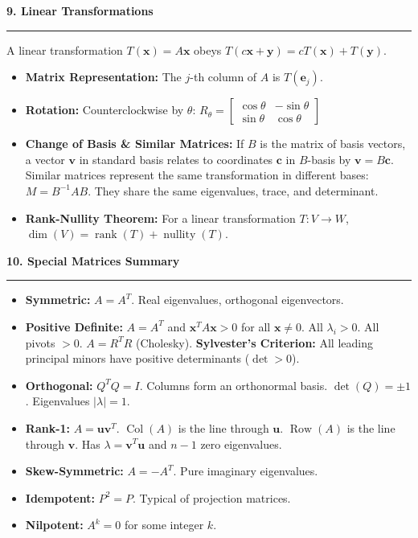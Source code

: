 \documentclass[10pt, landscape, twocolumn]{article}
\newcommand{\cheatsheetsection}[1]{
    \vspace{0.6em}
    {\color{themeblue}\large\bfseries #1} \par
    \vspace{-0.5em}
    {\color{themeblue}\rule{\linewidth}{1pt}} \par
    \vspace{0.2em}
}
\begin{document}
\cheatsheetsection{9. Linear Transformations}
A linear transformation $T(\mathbf{x}) = A\mathbf{x}$ obeys $T(c\mathbf{x} + \mathbf{y}) = cT(\mathbf{x}) + T(\mathbf{y})$.
\begin{itemize}[leftmargin=*, itemsep=4pt, parsep=0pt]
    \item \textbf{Matrix Representation:} The $j$-th column of $A$ is $T(\mathbf{e}_j)$.
    \item \textbf{Rotation:} Counterclockwise by $\theta$:
    $R_\theta = \left[ \begin{smallmatrix} \cos\theta & -\sin\theta \\ \sin\theta & \cos\theta \end{smallmatrix} \right]$
    \item \textbf{Change of Basis \& Similar Matrices:} If $B$ is the matrix of basis vectors, a vector $\mathbf{v}$ in standard basis relates to coordinates $\mathbf{c}$ in $B$-basis by $\mathbf{v} = B\mathbf{c}$. Similar matrices represent the same transformation in different bases: $M = B^{-1} A B$. They share the same eigenvalues, trace, and determinant.
    \item \textbf{Rank-Nullity Theorem:} For a linear transformation $T: V \to W$, $\dim(V) = \operatorname{rank}(T) + \operatorname{nullity}(T)$.
\end{itemize}

\cheatsheetsection{10. Special Matrices Summary}
\begin{itemize}[leftmargin=*, itemsep=4pt, parsep=0pt]
    \item \textbf{Symmetric:} $A = A^T$. Real eigenvalues, orthogonal eigenvectors.
    \item \textbf{Positive Definite:} $A = A^T$ and $\mathbf{x}^T A \mathbf{x} > 0$ for all $\mathbf{x} \neq 0$. All $\lambda_i > 0$. All pivots $> 0$. $A = R^T R$ (Cholesky). \textbf{Sylvester's Criterion:} All leading principal minors have positive determinants ($\det > 0$).
    \item \textbf{Orthogonal:} $Q^T Q = I$. Columns form an orthonormal basis. $\det(Q) = \pm 1$. Eigenvalues $|\lambda| = 1$.
    \item \textbf{Rank-1:} $A = \mathbf{u}\mathbf{v}^T$. $\operatorname{Col}(A)$ is the line through $\mathbf{u}$. $\operatorname{Row}(A)$ is the line through $\mathbf{v}$. Has $\lambda = \mathbf{v}^T \mathbf{u}$ and $n-1$ zero eigenvalues.
    \item \textbf{Skew-Symmetric:} $A = -A^T$. Pure imaginary eigenvalues.
    \item \textbf{Idempotent:} $P^2 = P$. Typical of projection matrices.
    \item \textbf{Nilpotent:} $A^k = 0$ for some integer $k$.
\end{itemize}
\end{document}
